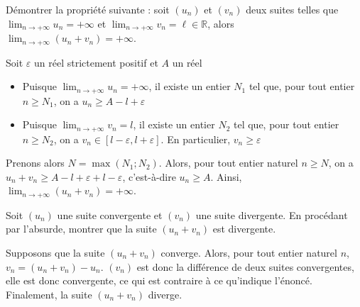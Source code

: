\documentclass[11pt,fleqn]{book} %
\begin{document}
\begin{exercise}Démontrer la propriété suivante : soit $(u_n)$ et $(v_n)$ deux suites telles que $\displaystyle\lim_{n \to + \infty}u_n=+\infty$ et $\displaystyle\lim_{n \to + \infty}v_n=\ell \in \mathbb{R}$, alors $\displaystyle\lim_{n \to + \infty}(u_n+v_n)=+\infty$.\end{exercise}
\begin{solution}Soit $\varepsilon$ un réel strictement positif et $A$ un réel
\begin{itemize}
\item Puisque $\displaystyle\lim_{n \to+\infty}u_n=+\infty$, il existe un entier $N_1$ tel que, pour tout entier $n\geqslant N_1$, on a $u_n \geqslant A - l + \varepsilon$
\item Puisque $\displaystyle\lim_{n \to+\infty}v_n=l$, il existe un entier $N_2$ tel que, pour tout entier $n\geqslant N_2$, on a $v_n \in [l-\varepsilon, l+\varepsilon]$. En particulier, $v_n\geqslant \varepsilon$
\end{itemize}
Prenons alors $N=\max(N_1;N_2)$. Alors, pour tout entier naturel $n \geqslant N$, on a $u_n+v_n \geqslant A -l+\varepsilon +l-\varepsilon$, c'est-à-dire $u_n\geqslant A$. Ainsi, $\displaystyle\lim_{n\to+\infty}(u_n+v_n)=+\infty$.\end{solution}



\begin{exercise}Soit $(u_n)$ une suite convergente et $(v_n)$ une suite divergente. En procédant par l'absurde, montrer que la suite $(u_n+v_n)$ est divergente.\end{exercise}

\begin{solution}Supposons que la suite $(u_n+v_n)$ converge. Alors, pour tout entier naturel $n$, $v_n=(u_n+v_n)-u_n$. $(v_n)$ est donc la différence de deux suites convergentes, elle est donc convergente, ce qui est contraire à ce qu'indique l'énoncé. Finalement, la suite $(u_n+v_n)$ diverge.\end{solution}
\end{document}
